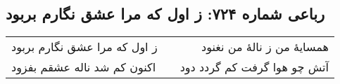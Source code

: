 \begin{center}
\section*{رباعی شماره ۷۲۴: ز اول که مرا عشق نگارم بربود}
\label{sec:0724}
\begin{longtable}{l p{0.5cm} r}
ز اول که مرا عشق نگارم بربود
&&
همسایهٔ من ز نالهٔ من نغنود
\\
اکنون کم شد ناله عشقم بفزود
&&
آتش چو هوا گرفت کم گردد دود
\\
\end{longtable}
\end{center}
